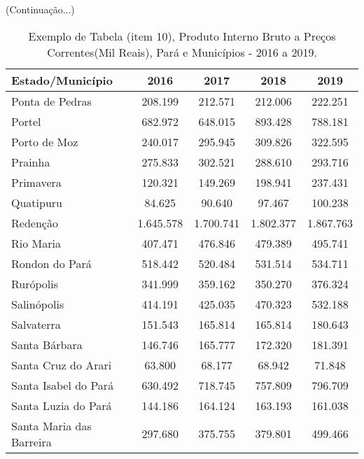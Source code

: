 \newpage
\begin{table}[!htb]
    \centering
    {
    \caption{Exemplo de Tabela (item 10), Produto Interno Bruto a Preços Correntes(Mil Reais), Pará e Municípios - 2016 a 2019.}  (Continuação...)
    \label{item 10 regras4}
    \vspace{0.1cm}
\begin{tabular}{l|c|c|c|c}
  \hline\hline
  Estado/Município          &    2016     &    2017    &  2018     &  2019         \\
  \hline\hline
   Ponta de Pedras          &  208.199    & 212.571    & 212.006   & 222.251       \\
   Portel                   &  682.972    & 648.015    & 893.428   &  788.181       \\
   Porto de Moz             &  240.017    & 295.945    & 309.826   & 322.595        \\
   Prainha                  &  275.833    & 302.521    & 288.610   & 293.716        \\ 
   Primavera                &  120.321    & 149.269    & 198.941   & 237.431        \\
   Quatipuru                &  84.625     & 90.640     & 97.467    & 100.238        \\
   Redenção                 &  1.645.578  & 1.700.741  & 1.802.377 &  1.867.763     \\
   Rio Maria                &  407.471    & 476.846    & 479.389   &  495.741       \\
   Rondon do Pará           &  518.442    & 520.484    & 531.514   &  534.711       \\
   Rurópolis                &  341.999    & 359.162    & 350.270   &  376.324       \\
   Salinópolis              &  414.191    & 425.035    & 470.323   &  532.188        \\
   Salvaterra               &  151.543    & 165.814    & 165.814   & 180.643         \\
   Santa Bárbara            &  146.746    & 165.777    & 172.320   & 181.391         \\
   Santa Cruz do Arari      &  63.800     & 68.177     & 68.942    & 71.848          \\
   Santa Isabel do Pará     &  630.492    & 718.745    & 757.809   & 796.709         \\
   Santa Luzia do Pará      &  144.186    & 164.124    & 163.193   & 161.038         \\
   Santa Maria das Barreira & 297.680     & 375.755    & 379.801   & 499.466         \\

\end{tabular}}
\end{table}
